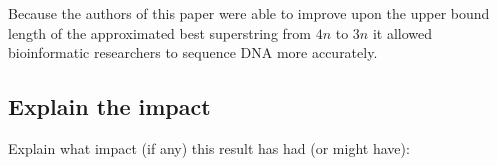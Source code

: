 \documentclass[letterpaper,twocolumn,12pt]{article}
\begin{document}
Because the authors of this paper were able to improve upon the upper bound length of the approximated best superstring from $4n$ to $3n$ it allowed bioinformatic researchers to sequence DNA more accurately. 



\subsection*{Explain the impact}
Explain what impact (if any) this result has had (or might have):



{
  \small 
  
  
}
\end{document}
